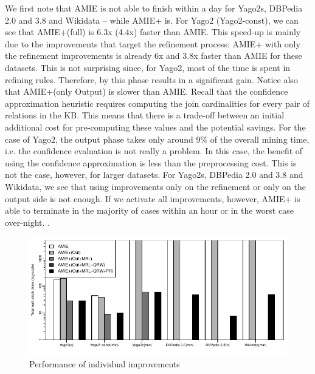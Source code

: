 We first note that AMIE is not able to finish within a day for Yago2s, DBPedia 2.0 and 3.8 and Wikidata -- while AMIE+ is.
For Yago2 (Yago2-const), we can see that AMIE+(full) is  6.3x (4.4x) faster than AMIE. This speed-up is mainly due to the improvements
that target the refinement process:
AMIE+ with only the refinement improvements is already 6x and 3.8x faster than AMIE for these datasets. This is not surprising since,
for Yago2,  most of the time is spent in refining rules. Therefore, by this phase results in a significant gain.
Notice also that AMIE+(only Output) is slower than AMIE. Recall that the confidence approximation heuristic requires  computing the
join cardinalities for every pair of relations in the KB. This means that there is a trade-off between an initial additional cost 
for pre-computing these values and the potential savings. For the case of Yago2, the output phase takes only around 9\% 
of the overall mining time, i.e. the
confidence evaluation is not really a problem. In this case, the benefit of using the confidence approximation is less than the preprocessing cost. 
This is not the case, however, for larger datasets.
For Yago2s, DBPedia 2.0 and 3.8 and Wikidata, we see that using improvements only on the refinement or only on the output side is not enough.  
If we activate all improvements, however, AMIE+ is able to terminate in the majority of cases within an hour or in the worst case over-night.
.

\begin{figure}
\centering
\includegraphics{figures/individual}
\caption{Performance of individual improvements}
\label{individual}
\end{figure}



